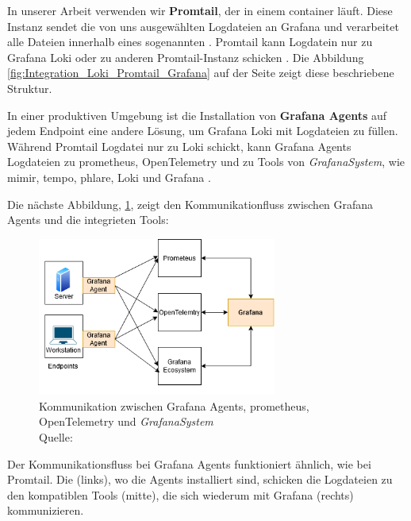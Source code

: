 In unserer Arbeit verwenden wir \textbf{Promtail}, der in einem \gls{container} läuft. Diese Instanz sendet die von uns ausgewählten Logdateien an Grafana und verarbeitet alle Dateien innerhalb eines sogenannten . Promtail kann Logdatein nur zu Grafana Loki oder zu anderen Promtail-Instanz schicken \citep{Grafana_Promtail}. Die Abbildung \ref{fig:Integration_Loki_Promtail_Grafana} auf der Seite \pageref{fig:Integration_Loki_Promtail_Grafana} zeigt diese beschriebene Struktur.

In einer produktiven Umgebung ist die Installation von \textbf{Grafana Agents} auf jedem \gls{Endpoint} eine andere Lösung, um Grafana Loki mit Logdateien zu füllen. Während Promtail Logdatei nur zu Loki schickt, kann Grafana Agents Logdateien zu \gls{prometheus}, OpenTelemetry und zu Tools von \textit{\gls{GrafanaSystem}}, wie \gls{mimir}, \gls{tempo}, \gls{phlare}, Loki und Grafana \citep{Grafana_Agents}.

\newpage
Die nächste Abbildung, \ref{fig:GrafAgents}, zeigt den Kommunikationfluss zwischen Grafana Agents und die integrieten Tools:

\begin{figure}[H]
   \centering
   \includegraphics[width=0.7\textwidth]{assets/GrafanaAgents.drawio.png}
   \caption[Kommunikation zwischen Grafana Agents, \gls{prometheus}, OpenTelemetry und \textit{\gls{GrafanaSystem}}]
   {Kommunikation zwischen Grafana Agents, \gls{prometheus}, OpenTelemetry und \textit{\gls{GrafanaSystem}}\\Quelle: \citep{Grafana_Agents}}
   \label{fig:GrafAgents}
   \centering
\end{figure}

Der Kommunikationsfluss bei Grafana Agents funktioniert ähnlich, wie bei Promtail. Die  (links), wo die Agents installiert sind, schicken die Logdateien zu den kompatiblen Tools (mitte), die sich wiederum mit Grafana (rechts) kommunizieren.

